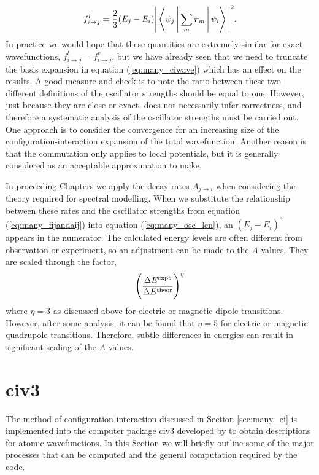\begin{equation}\label{eq:many_osc_len}
f_{i\rightarrow j}^l = \frac{2}{3}(E_j-E_i) \Bigg | \Braket{\psi_j | \sum_m\boldsymbol{r}_m | \psi_i} \Bigg |^2.
\end{equation}
In practice we would hope that these quantities are extremely similar for exact wavefunctions, $f_{i\rightarrow j}^l =f_{i\rightarrow j}^v$, but we have already seen that we need to truncate the basis expansion in equation (\ref{eq:many_ciwave}) which has an effect on the results. A good measure and check is to note the ratio between these two different definitions of the oscillator strengths should be equal to one. However, just because they are close or exact, does not necessarily infer correctness, and therefore a systematic analysis of the oscillator strengths must be carried out. One approach is to consider the convergence for an increasing size of the configuration-interaction expansion of the total wavefunction. Another reason is that the commutation only applies to local potentials, but it is generally considered as an acceptable approximation to make.

In proceeding Chapters we apply the decay rates $A_{j \rightarrow i}$ when considering the theory required for spectral modelling. When we substitute the relationship between these rates and the oscillator strengths from equation (\ref{eq:many_fijandaij}) into equation (\ref{eq:many_osc_len}), an $(E_j-E_i)^3$ appears in the numerator. The calculated energy levels are often different from observation or experiment, so an adjustment can be made to the $A$-values. They are scaled through the factor,
\begin{equation}\label{eq:many_ascale}
\Bigg(\frac{\Delta E^{{\rm expt}}}{\Delta E^{{\rm theor}}}\Bigg)^\eta
\end{equation}
where $\eta = 3$ as discussed above for electric or magnetic dipole transitions. However, after some analysis, it can be found that $\eta=5$ for electric or magnetic quadrupole transitions. Therefore, subtle differences in energies can result in significant scaling of the $A$-values. 

\section{{\sc civ3}}\label{sec:many_civ3}
The method of configuration-interaction discussed in Section \ref{sec:many_ci} is implemented into the computer package {\sc civ3} developed by \citet{1975CoPhC...9..141H} to obtain descriptions for atomic wavefunctions. In this Section we will briefly outline some of the major processes that can be computed and the general computation required by the code.

